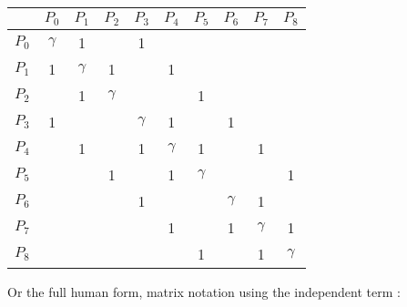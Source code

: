 \documentclass[legalpaper, 12pt]{article}
\begin{document}
\begin{center}
\begin{tabular}{| c | c | c | c | c | c | c | c | c | c |}
\hline
	        & $ P_0 $ & $ P_1 $ & $ P_2 $ & $ P_3 $ & $ P_4 $ & $ P_5 $ & $ P_6 $ & $ P_7 $ & $ P_8 $ \\ \hline
	$ P_0 $ &$\gamma$ &    1    &         &    1    &         &         &         &         &         \\ \hline
	$ P_1 $ &    1    &$\gamma$ &     1   &         &     1   &         &         &         &         \\ \hline
	$ P_2 $ &         &    1    &$\gamma$ &         &         &    1    &         &         &         \\ \hline
	$ P_3 $ &    1    &         &         &$\gamma$ &    1    &         &    1    &         &         \\ \hline
	$ P_4 $ &         &    1    &         &    1    &$\gamma$ &    1    &         &    1    &         \\ \hline
	$ P_5 $ &         &         &    1    &         &    1    &$\gamma$ &         &         &    1    \\ \hline
	$ P_6 $ &         &         &         &    1    &         &         &$\gamma$ &    1    &         \\ \hline
	$ P_7 $ &         &         &         &         &    1    &         &    1    &$\gamma$ &    1    \\ \hline
    $ P_8 $ &         &         &         &         &         &    1    &         &    1    &$\gamma$ \\ \hline
\end{tabular} 
\end{center}


Or the full human form, matrix notation using the independent term :
\end{document}
